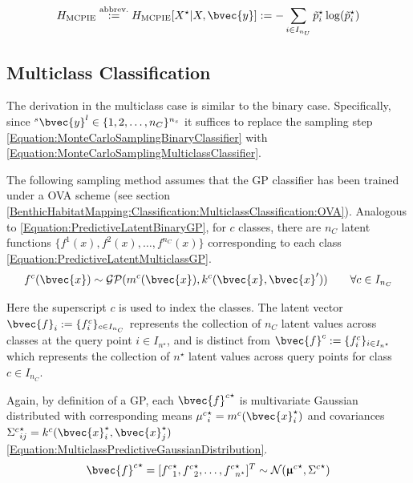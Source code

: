 			\begin{equation}
				H_{\mathrm{MCPIE}} \stackrel{\text{abbrev.}}{:=} H_{\mathrm{MCPIE}}[X^{\star} | X, \bvec{y}] := - \sum_{i \in I_{n_{U}}} \tilde{p}^{\star}_{i} \log(\tilde{p}^{\star}_{i})
			\label{Equation:MCPIE}
			\end{equation}		
			
		\subsection{Multiclass Classification}
		\label{InformativeSeafloorExploration:MCJPIE:Multiclass}
		
			The derivation in the multiclass case is similar to the binary case. Specifically, since ${^{s}}\bvec{y}^{l} \in \{1, 2, \dots, n_{C}\}^{n_{s}}$ it suffices to replace the sampling step \eqref{Equation:MonteCarloSamplingBinaryClassifier} with \eqref{Equation:MonteCarloSamplingMulticlassClassifier}.
			
			The following sampling method assumes that the GP classifier has been trained under a OVA scheme (see section \ref{BenthicHabitatMapping:Classification:MulticlassClassification:OVA}). Analogous to \eqref{Equation:PredictiveLatentBinaryGP}, for $c$ classes, there are $n_{C}$ latent functions $\{f^{1}(x), f^{2}(x), \dots, f^{n_{C}}(x)\}$ corresponding to each class \eqref{Equation:PredictiveLatentMulticlassGP}. \begin{equation}
				f^{c}(\bvec{x}) \sim \mathcal{GP}(m^{c}(\bvec{x}), k^{c}(\bvec{x}, \bvec{x}')) \qquad \forall c \in I_{n_{C}}
			\label{Equation:PredictiveLatentMulticlassGP}
			\end{equation}
						
			Here the superscript $c$ is used to index the classes. The latent vector $\bvec{f}_{i} := \{f^{c}_{i}\}_{c \in I_{n_{C}}}$ represents the collection of $n_{C}$ latent values across classes at the query point $i \in I_{n^{\star}}$, and is distinct from $\bvec{f}^{c} := \{f^{c}_{i}\}_{i \in I_{n^{\star}}}$ which represents the collection of $n^{\star}$ latent values across query points for class $c \in I_{n_{C}}$.
			
			Again, by definition of a GP, each ${\bvec{f}^{c}}^{\star}$ is multivariate Gaussian distributed with corresponding means ${\mu^{c}}^{\star}_{i} = m^{c}(\bvec{x}^{\star}_{i})$ and covariances ${\Sigma^{c}}^{\star}_{ij} = k^{c}(\bvec{x}^{\star}_{i}, \bvec{x}^{\star}_{j})$ \eqref{Equation:MulticlassPredictiveGaussianDistribution}. \begin{equation}
				{\bvec{f}^{c}}^{\star} = [{f^{c}}^{\star}_{1}, {f^{c}}^{\star}_{2}, \dots, {f^{c}}^{\star}_{n^{\star}}]^{T} \sim \mathcal{N}({\vec{\upmu}^{c}}^{\star}, {\Sigma^{c}}^{\star})
			\label{Equation:MulticlassPredictiveGaussianDistribution}
			\end{equation}
			
